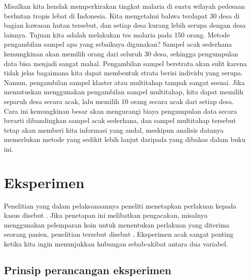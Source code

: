 \begin{examplewrap}
\begin{nexample}{Misalkan kita hendak memperkirakan tingkat malaria
    di suatu wilayah pedesaan berhutan tropis lebat di Indonesia.
    Kita mengetahui bahwa terdapat 30 desa di bagian kawasan hutan tersebut,
    dan setiap desa kurang lebih serupa dengan desa lainnya.
    Tujuan kita adalah melakukan tes malaria pada 150 orang.
    Metode pengambilan sampel apa yang sebaiknya digunakan?}
  Sampel acak sederhana kemungkinan akan memilih orang dari seluruh 30 desa,
  sehingga pengumpulan data bisa menjadi sangat mahal.
  Pengambilan sampel berstrata akan sulit karena tidak jelas bagaimana kita
  dapat membentuk strata berisi individu yang serupa.
  Namun, pengambilan sampel klaster atau multitahap tampak sangat sesuai.
  Jika memutuskan menggunakan pengambilan sampel multitahap, kita dapat memilih
  separuh desa secara acak, lalu memilih 10 orang secara acak dari setiap desa.
  Cara ini kemungkinan besar akan mengurangi biaya pengumpulan data secara
  berarti dibandingkan sampel acak sederhana, dan sampel multitahap tersebut
  tetap akan memberi kita informasi yang andal, meskipun analisis datanya
  memerlukan metode yang sedikit lebih lanjut daripada yang dibahas dalam
  buku ini.
\end{nexample}
\end{examplewrap}


{}






\section{Eksperimen}
\label{experimentsSection}

Penelitian yang dalam pelaksanaannya peneliti menetapkan perlakuan kepada kasus disebut . Jika penetapan ini melibatkan pengacakan, misalnya menggunakan pelemparan koin untuk menentukan perlakuan yang diterima seorang pasien, penelitian tersebut disebut . Eksperimen acak sangat penting ketika kita ingin menunjukkan hubungan sebab-akibat antara dua variabel.


\subsection{Prinsip perancangan eksperimen}
\label{experimentalDesignPrinciples}

